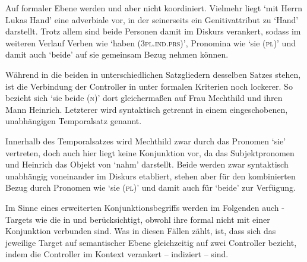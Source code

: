 Auf formaler Ebene werden  und  aber nicht
koordiniert. Vielmehr liegt  `mit
Herrn Lukas Hand' eine adverbiale  vor,
in der  seinerseits ein Genitivattribut zu 
`Hand' darstellt. Trotz allem sind beide Personen damit im Diskurs
verankert, sodass im weiteren Verlauf Verben wie 
`haben (\textsc{3pl.ind.prs})', Pronomina wie  `sie (\textsc{pl})'
und damit auch  `beide' auf sie gemeinsam Bezug nehmen können.

Während in  die beiden  in
unterschiedlichen Satzgliedern desselben Satzes stehen, ist die Verbindung der
Controller in  unter formalen Kriterien noch lockerer.
So bezieht sich  `sie beide (\textsc{n})' dort gleichermaßen auf
Frau Mechthild und ihren Mann Heinrich. Letzterer wird syntaktisch getrennt in
einem eingeschobenen, unabhängigen Temporalsatz genannt.


Innerhalb des Temporalsatzes wird Mechthild zwar durch das Pronomen 
`sie' vertreten, doch auch hier liegt keine Konjunktion vor, da  das
Subjektpronomen und Heinrich das Objekt von  `nahm' darstellt. Beide
 werden zwar syntaktisch unabhängig voneinander im Diskurs
etabliert, stehen aber für den kombinierten Bezug durch Pronomen wie
 `sie (\textsc{pl})' und damit auch für 
`beide' zur Verfügung.

Im Sinne eines erweiterten Konjunktionsbegriffs werden im Folgenden auch
-Targets wie die in  und
 berücksichtigt, obwohl ihre  formal
nicht mit einer Konjunktion verbunden sind. Was in diesen Fällen zählt, ist,
dass sich das jeweilige Target auf semantischer Ebene gleichzeitig auf zwei
Controller bezieht, indem die Controller im Kontext
verankert -- indiziert -- sind.

